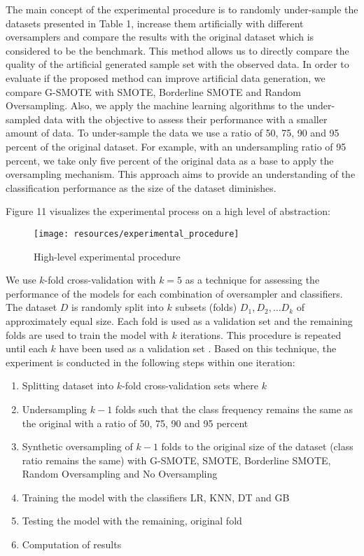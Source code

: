 \documentclass[parskip=full]{scrartcl}
\begin{document}
The main concept of the experimental procedure is to randomly under-sample 
the datasets presented in Table 1, increase them artificially with different 
oversamplers and compare the results with the original dataset which is 
considered to be the benchmark. This method allows us to directly compare the 
quality of the artificial generated sample set with the observed data. In order 
to evaluate if the proposed method can improve artificial data generation, we 
compare G-SMOTE with SMOTE, Borderline SMOTE and Random Oversampling. Also, we 
apply the machine learning algorithms to the under-sampled data with the 
objective to assess their performance with a smaller amount of data. To 
under-sample the data we use a ratio of 50, 75, 90 and 95 percent of the 
original dataset. For example, with an undersampling ratio of 95 percent, we 
take only five percent of the original data as a base to apply the oversampling 
mechanism. This approach aims to provide an understanding of the classification 
performance as the size of the dataset diminishes.

Figure 11 visualizes the experimental process on a high level of abstraction: 

\begin{figure}[H]
	\centering
	\texttt{[image: resources/experimental\_procedure]}
	\caption{High-level experimental procedure}
	\label{fig:experimentalprocedure}
\end{figure}


We use \( k \)-fold cross-validation with \( k = 5 \) as a technique 
for assessing the performance of the models for each combination of oversampler 
and classifiers. The dataset \( D \) is randomly split into \( k \) 
subsets (folds) \( D_1, D_2, … D_k \) of approximately equal size. Each 
fold is used as a validation set and the remaining folds are used to train the 
model with \( k \) iterations. This procedure is repeated until each 
\( k \) have been used as a validation set \cite{Han.2012}. Based on this 
technique, the experiment is conducted in the following steps within one 
iteration:

\begin{enumerate}
	\item 
	Splitting dataset into \( k \)-fold cross-validation sets where \( k \)
	\item 
	Undersampling \( k - 1 \) folds such that the class frequency remains 
	the same as the original with a ratio of 50, 75, 90 and 95 percent
	\item 
	Synthetic oversampling of \( k - 1 \) folds to the original size of 
	the dataset (class ratio remains the same) with G-SMOTE, SMOTE, Borderline 
	SMOTE, Random Oversampling and No Oversampling
	\item 
	Training the model with the classifiers LR, KNN, DT and GB
	\item 
	Testing the model with the remaining, original fold
	\item 
	Computation of results
\end{enumerate}	
\end{document}
